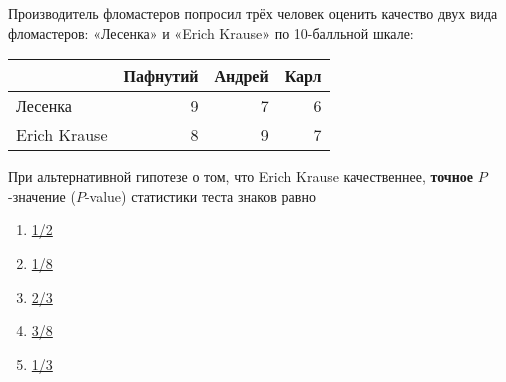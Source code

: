 \documentclass[t]{beamer}
\begin{document}
 \begin{frame} \label{24} 
\begin{block}{24} 

  Производитель фломастеров попросил трёх человек оценить качество двух вида фломастеров: «Лесенка» и «Erich Krause» по 10-балльной шкале:

\begin{center}
\begin{tabular}{lrrr} \toprule
 & Пафнутий & Андрей & Карл \\
\midrule
Лесенка & 9 & 7 & 6 \\
Erich Krause & 8 & 9 & 7 \\
\bottomrule
\end{tabular}
\end{center}

При альтернативной гипотезе о том, что Erich Krause качественнее, \textbf{точное} $P$-значение ($P$-value) статистики теста знаков равно

  


 \end{block} 
\begin{enumerate} 
\item[] \hyperlink{24-Yes}{\beamergotobutton{} 1/2}
\item[] \hyperlink{24-No}{\beamergotobutton{} 1/8}
\item[] \hyperlink{24-No}{\beamergotobutton{} 2/3}
\item[] \hyperlink{24-No}{\beamergotobutton{} 3/8}
\item[] \hyperlink{24-No}{\beamergotobutton{} 1/3}
\end{enumerate} 
\end{frame} 
\end{document}
